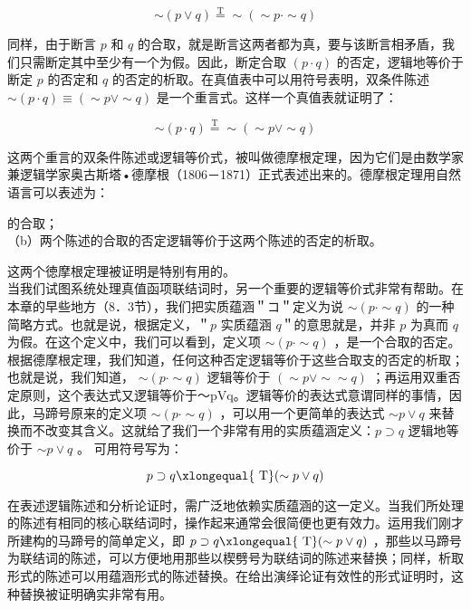 $$
\sim(p \vee q) \stackrel{\mathrm{T}}{=} \sim(\sim p \cdot \sim q)
$$

同样，由于断言 $p$ 和 $q$ 的合取，就是断言这两者都为真，要与该断言相矛盾，我们只需断定其中至少有一个为假。因此，断定合取 $(p \cdot q)$ 的否定，逻辑地等价于断定 $p$ 的否定和 $q$ 的否定的析取。在真值表中可以用符号表明，双条件陈述 $\sim(p \cdot q) \equiv(\sim p \vee \sim q)$ 是一个重言式。这样一个真值表就证明了：

$$
\sim(p \cdot q) \stackrel{\mathrm{T}}{=} \sim(\sim p \vee \sim q)
$$

这两个重言的双条件陈述或逻辑等价式，被叫做德摩根定理，因为它们是由数学家兼逻辑学家奥古斯塔•德摩根（1806－1871）正式表述出来的。德摩根定理用自然语言可以表述为：

的合取；\\
（b）两个陈述的合取的否定逻辑等价于这两个陈述的否定的析取。

这两个徳摩根定理被证明是特别有用的。\\
当我们试图系统处理真值函项联结词时，另一个重要的逻辑等价式非常有帮助。在本章的早些地方（8．3节），我们把实质蕴涵＂コ＂定义为说 $\sim(p \cdot \sim q)$ 的一种简略方式。也就是说，根据定义，＂$p$ 实质蕴涵 $q$＂的意思就是，并非 $p$ 为真而 $q$ 为假。在这个定义中，我们可以看到，定义项 $\sim(p \cdot \sim q)$ ，是一个合取的否定。根据德摩根定理，我们知道，任何这种否定逻辑等价于这些合取支的否定的析取；也就是说，我们知道， $\sim(p \cdot \sim q)$ 逻辑等价于 $(\sim p \vee \sim \sim q)$ ；再运用双重否定原则，这个表达式又逻辑等价于～pVq。逻辑等价的表达式意谓同样的事情，因此，马蹄号原来的定义项 $\sim(p \cdot \sim q)$ ，可以用一个更简单的表达式 $\sim p \vee q$ 来替换而不改变其含义。这就给了我们一个非常有用的实质蕴涵定义：$p \supset q$ 逻辑地等价于 $\sim p \vee q$ 。 可用符号写为：

$$
p \supset q \xlongequal{\mathrm{~T}}(\sim p \vee q)
$$

在表述逻辑陈述和分析论证时，需广泛地依赖实质蕴涵的这一定义。当我们所处理的陈述有相同的核心联结词时，操作起来通常会很简便也更有效力。运用我们刚才所建构的马蹄号的简单定义，即 $p \supset q \xlongequal{\mathrm{~T}}(\sim p \vee q)$ ，那些以马蹄号为联结词的陈述，可以方便地用那些以楔劈号为联结词的陈述来替换；同样，析取形式的陈述可以用蕴涵形式的陈述替换。在给出演绎论证有效性的形式证明时，这种替换被证明确实非常有用。 